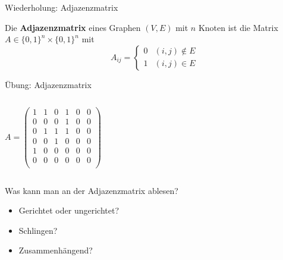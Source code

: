 
\begin{frame}{Wiederholung: Adjazenzmatrix}
	\begin{Definition}
		Die \textbf{Adjazenzmatrix} eines Graphen $(V, E)$ mit $n$ Knoten ist die Matrix $A\in \{0,1\}^n\times\{0,1\}^n$ mit $$ A_{ij} = \begin{cases} 0 & (i,j) \notin E \\ 1 & (i,j) \in E \end{cases} $$ 
	\end{Definition}
\end{frame}

\begin{frame}{Übung: Adjazenzmatrix}
	\begin{columns}
		$$ A = 
		\begin{pmatrix} 
			1 & 1 & 0 & 1 & 0 & 0 \\ 
			0 & 0 & 0 & 1 & 0 & 0 \\ 
			0 & 1 & 1 & 1 & 0 & 0 \\ 
			0 & 0 & 1 & 0 & 0 & 0 \\
			1 & 0 & 0 & 0 & 0 & 0 \\
			0 & 0 & 0 & 0 & 0 & 0 \\
		\end{pmatrix} $$
		
	\end{columns}

	\bigskip
	Was kann man an der Adjazenzmatrix ablesen?
	\begin{itemize}[<+->]
		\item Gerichtet oder ungerichtet?
		\item Schlingen?
		\item Zusammenhängend?
	\end{itemize}
\end{frame}

